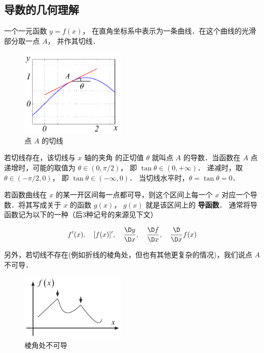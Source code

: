 

\subsection{导数的几何理解}

一个一元函数 $y = f\left( x \right)$， 在直角坐标系中表示为一条曲线．在这个曲线的光滑部分取一点 $A$， 并作其切线．

\begin{figure}[ht]
\centering
\includegraphics[width=5cm]{./figures/Der1.pdf}
\caption{点 $A$ 的切线}
\end{figure}


若切线存在，该切线与 $x$ 轴的夹角 的正切值 $\theta$ 就叫点 $A$ 的导数．当函数在 $A$ 点递增时，可能的取值为 $\theta  \in \left( {0,\pi/2} \right)$， 即 $\tan \theta  \in \left( {0, + \infty } \right)$． 递减时，取 $\theta  \in (-\pi/2,0)$， 即 $\tan \theta  \in (-\infty ,0)$． 当切线水平时，$\theta  = \tan \theta  = 0$． 

若函数曲线在 $x$ 的某一开区间每一点都可导，则这个区间上每一个 $x$ 对应一个导数．将其写成关于 $x$ 的函数 $g\left( x \right)$，  $g\left( x \right)$  就是该区间上的 \textbf{导函数}． 通常将导函数记为以下的一种（后3种记号的来源见下文）

\begin{equation}\label{Der_eq1}
f'(x),\quad [f(x)]',\quad \frac{\D y}{\D x},\quad \frac{\D f}{\D x},\quad\frac{\D}{\D x}f(x)
\end{equation}


另外，若切线不存在(例如折线的棱角处，但也有其他更复杂的情况)，我们说点 $A$ 不可导．

\begin{figure}[ht]
\centering
\includegraphics[width=5cm]{./figures/Der3.pdf}
\caption{棱角处不可导}
\end{figure}


